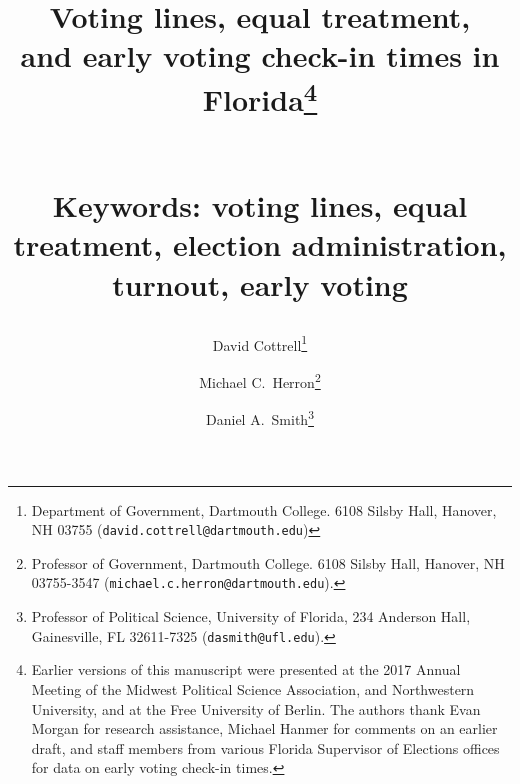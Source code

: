 \documentclass[12pt,titlepage]{article}
\providecommand{\keywords}[1]{\textbf{\normalsize{Keywords: }} \normalsize{#1}}
\begin{document}
\sloppy
\thispagestyle{empty}


\renewcommand{\topfraction}{.85}
\renewcommand{\bottomfraction}{.7}
\renewcommand{\textfraction}{.15}
\renewcommand{\floatpagefraction}{.66}
\renewcommand{\dbltopfraction}{.66}
\renewcommand{\dblfloatpagefraction}{.66}



\title{Voting lines, equal treatment,\\and early voting check-in times
  in Florida\thanks{Earlier versions of this manuscript were presented
    at the 2017 Annual Meeting of the Midwest Political Science
    Association, and Northwestern University, and at the Free
    University of Berlin.  The authors thank Evan Morgan for research
    assistance, Michael Hanmer for comments on an earlier draft, and
    staff members from various Florida Supervisor of Elections offices
    for data on early voting check-in times.}\author{David
    Cottrell\thanks{Department of Government, Dartmouth College.  6108
      Silsby Hall, Hanover, NH 03755
      (\texttt{david.cottrell@dartmouth.edu})} \and Michael C.\
    Herron\thanks{Professor of Government, Dartmouth College.  6108
      Silsby Hall, Hanover, NH 03755-3547
      (\texttt{michael.c.herron@dartmouth.edu}).} \and Daniel A.\
    Smith\thanks{Professor of Political Science, University of
      Florida, 234 Anderson Hall, Gainesville, FL 32611-7325
      (\texttt{dasmith@ufl.edu}).}}\vspace{1cm}\\\keywords{voting
    lines, equal treatment, election administration, turnout, early
    voting}}



\maketitle \doublespacing 



\end{document}
